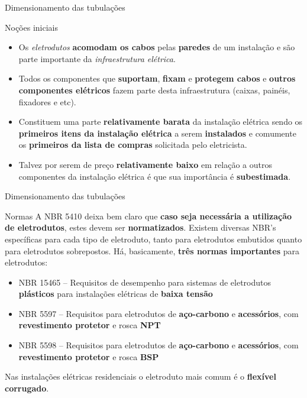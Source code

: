 \begin{frame}{Dimensionamento das tubulações}
	\begin{block}{Noções iniciais}
		\begin{itemize}
			\item Os \textit{eletrodutos} \textbf{acomodam os cabos }pelas \textbf{paredes }de um instalação e são parte importante da \textit{infraestrutura elétrica}.
			\item Todos os componentes que \textbf{suportam}, \textbf{fixam} e \textbf{protegem cabos} e \textbf{outros componentes elétricos} fazem parte desta infraestrutura (caixas, painéis, fixadores e etc).
			\item Constituem uma parte \textbf{relativamente barata} da instalação elétrica sendo os \textbf{primeiros itens da instalação elétrica} a serem \textbf{instalados} e comumente os \textbf{primeiros da lista de compras} solicitada pelo eletricista.
			\item Talvez por serem de preço \textbf{relativamente baixo} em relação a outros componentes da instalação elétrica é que sua importância é \textbf{subestimada}.
		\end{itemize}
	\end{block}
\end{frame}


\begin{frame}{Dimensionamento das tubulações}
	\begin{block}{Normas}
		A NBR 5410 deixa bem claro que \textbf{caso seja necessária a utilização de eletrodutos}, estes devem ser \textbf{normatizados}. Existem diversas NBR’s específicas para cada tipo de eletroduto, tanto para eletrodutos embutidos quanto para eletrodutos sobrepostos. Há, basicamente, \textbf{três normas importantes} para eletrodutos:
		\begin{itemize}
			\item NBR 15465 -- Requisitos de desempenho para sistemas de eletrodutos \textbf{plásticos} para instalações elétricas de \textbf{baixa tensão}
			\item NBR 5597 -- Requisitos para eletrodutos de \textbf{aço-carbono} e \textbf{acessórios}, com \textbf{revestimento protetor} e rosca \textbf{NPT}
			\item NBR 5598 -- Requisitos para eletrodutos de \textbf{aço-carbono} e \textbf{acessórios}, com \textbf{revestimento protetor} e rosca \textbf{BSP}
		\end{itemize}
		Nas instalações elétricas residenciais o eletroduto mais comum é o \textbf{flexível corrugado}.
	\end{block}
\end{frame}



